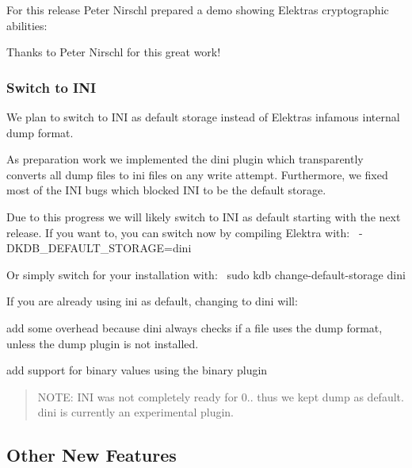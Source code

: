 For this release Peter Nirschl prepared a demo showing Elektra\textquotesingle{}s cryptographic abilities\+:

\href{https://asciinema.org/a/153014}{\tt }

Thanks to Peter Nirschl for this great work!

\subsubsection*{Switch to I\+NI}

We plan to switch to I\+NI as default storage instead of Elektra\textquotesingle{}s infamous internal dump format.

As preparation work we implemented the {\ttfamily dini} plugin which transparently converts all {\ttfamily dump} files to {\ttfamily ini} files on any write attempt. Furthermore, we fixed most of the I\+NI bugs which blocked I\+NI to be the default storage.

Due to this progress we will likely switch to I\+NI as default starting with the next release. If you want to, you can switch now by compiling Elektra with\+:~\newline
 {\ttfamily -\/\+D\+K\+D\+B\+\_\+\+D\+E\+F\+A\+U\+L\+T\+\_\+\+S\+T\+O\+R\+A\+GE=dini}

Or simply switch for your installation with\+:~\newline
 {\ttfamily sudo kdb change-\/default-\/storage dini}

If you are already using {\ttfamily ini} as default, changing to {\ttfamily dini} will\+:


\begin{DoxyItemize}
\item add some overhead because {\ttfamily dini} always checks if a file uses the {\ttfamily dump} format, unless the {\ttfamily dump} plugin is not installed.
\item add support for binary values using the {\ttfamily binary} plugin
\end{DoxyItemize}

\begin{quote}
N\+O\+TE\+: I\+NI was not completely ready for 0.. thus we kept {\ttfamily dump} as default. {\ttfamily dini} is currently an experimental plugin. \end{quote}


\subsection*{Other New Features}


